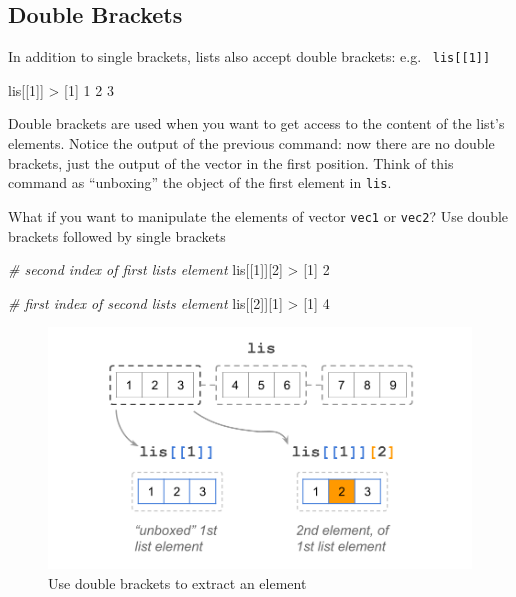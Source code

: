 \documentclass[
]{book}
\newenvironment{Shaded}{\begin{snugshade}}{\end{snugshade}}
\newcommand{\CommentTok}[1]{\textcolor[rgb]{0.56,0.35,0.01}{\textit{#1}}}
\newcommand{\DecValTok}[1]{\textcolor[rgb]{0.00,0.00,0.81}{#1}}
\newcommand{\NormalTok}[1]{#1}
\newcommand{\SpecialCharTok}[1]{\textcolor[rgb]{0.00,0.00,0.00}{#1}}
\begin{document}
\hypertarget{double-brackets}{%
\subsection{Double Brackets}\label{double-brackets}}

In addition to single brackets, lists also accept double brackets: e.g.~
\texttt{lis{[}{[}1{]}{]}}

\begin{Shaded}
\begin{Highlighting}[]
\NormalTok{lis[[}\DecValTok{1}\NormalTok{]]}
\SpecialCharTok{\textgreater{}}\NormalTok{ [}\DecValTok{1}\NormalTok{] }\DecValTok{1} \DecValTok{2} \DecValTok{3}
\end{Highlighting}
\end{Shaded}

Double brackets are used when you want to get access to the content of the
list's elements. Notice the output of the previous command: now there are no
double brackets, just the output of the vector in the first position. Think
of this command as ``unboxing'' the object of the first element in \texttt{lis}.

What if you want to manipulate the elements of vector \texttt{vec1} or \texttt{vec2}? Use
double brackets followed by single brackets

\begin{Shaded}
\begin{Highlighting}[]
\CommentTok{\# second index of first list\textquotesingle{}s element}
\NormalTok{lis[[}\DecValTok{1}\NormalTok{]][}\DecValTok{2}\NormalTok{]}
\SpecialCharTok{\textgreater{}}\NormalTok{ [}\DecValTok{1}\NormalTok{] }\DecValTok{2}

\CommentTok{\# first index of second list\textquotesingle{}s element}
\NormalTok{lis[[}\DecValTok{2}\NormalTok{]][}\DecValTok{1}\NormalTok{]}
\SpecialCharTok{\textgreater{}}\NormalTok{ [}\DecValTok{1}\NormalTok{] }\DecValTok{4}
\end{Highlighting}
\end{Shaded}

\begin{figure}

{\centering \includegraphics[width=0.75\linewidth]{images/objects/obj-list-brackets3} 

}

\caption{Use double brackets to extract an element}\label{fig:unnamed-chunk-156}
\end{figure}
\end{document}
